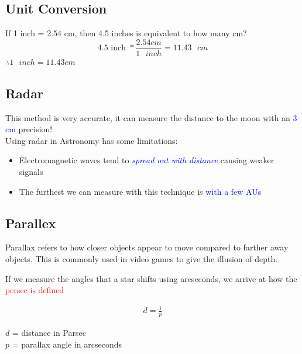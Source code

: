 \subsection{Unit Conversion}
\begin{blueblock}
\begin{example}
    If 1 inch = 2.54 cm, then 4.5 inches is equivalent to how many cm? \\
    \[
    4.5 \text{ inch } * \frac{2.54cm}{1\text{ }inch} = 11.43 \text{ }cm
    \]
    $\therefore 1 \text{ } inch = 11.43 cm$
\end{example}
\end{blueblock}

\subsection{Radar}
This method is very accurate, it can measure the distance to the moon with an \textcolor{blue}{3 cm} precision!\\

Using radar in Astronomy has some limitations:
\begin{itemize}
    \item Electromagnetic waves tend to \textcolor{blue}{\textit{spread out with distance}} causing weaker signals
    \item The furthest we can measure with this technique is \textcolor{blue}{with a few AUs}
\end{itemize}

\subsection{Parallex}
Parallax refers to how closer objects appear to move compared to farther away objects. This is commonly used in video games
to give the illusion of depth.\\


If we measure the angles that a star shifts using arcseconds, we arrive at how the \textcolor{red}{persec is defined}
\begin{cyanblock}
\begin{gather}
    d = \frac{1}{p}
\end{gather}

\begin{center}
    $d$ = distance in Parsec\\
    $p$ = parallax angle in arcseconds
\end{center}
\end{cyanblock}

